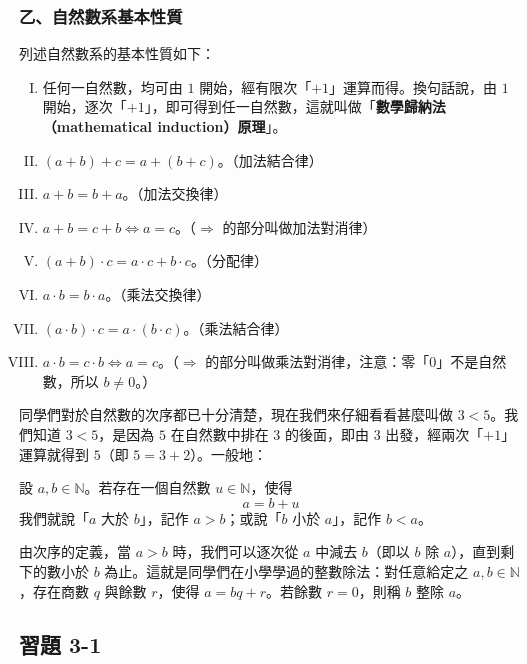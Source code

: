 \subsubsection*{乙、自然數系基本性質}\label{subsec:nat_axioms}

列述自然數系的基本性質如下：
\begin{enumerate}[I.]
  \item 任何一自然數，均可由 $1$ 開始，經有限次「$+1$」運算而得。換句話說，由 $1$ 開始，逐次「$+1$」，即可得到任一自然數，這就叫做「\textbf{數學歸納法（mathematical induction）原理}」。
  \item $(a+b)+c = a+(b+c)$。（加法結合律）
  \item $a+b = b+a$。（加法交換律）
  \item $a+b = c+b \iff a = c$。（$\Rightarrow$ 的部分叫做加法對消律）
  \item $(a+b) \cdot c = a \cdot c + b \cdot c$。（分配律）
  \item $a \cdot b = b \cdot a$。（乘法交換律）
  \item $(a \cdot b) \cdot c = a \cdot (b \cdot c)$。（乘法結合律）
  \item $a \cdot b = c \cdot b \iff a = c$。（$\Rightarrow$ 的部分叫做乘法對消律，注意：零「$0$」不是自然數，所以 $b \neq 0$。）
\end{enumerate}

同學們對於自然數的次序都已十分清楚，現在我們來仔細看看甚麼叫做 $3 < 5$。我們知道 $3 < 5$，是因為 $5$ 在自然數中排在 $3$ 的後面，即由 $3$ 出發，經兩次「$+1$」運算就得到 $5$（即 $5 = 3 + 2$）。一般地：

\begin{definition}[自然數的大小次序]\label{def:nat_order}
設 $a, b \in \mathbb{N}$。若存在一個自然數 $u \in \mathbb{N}$，使得
\begin{equation}\label{eq:nat_greater}
  a = b + u
\end{equation}
我們就說「$a$ 大於 $b$」，記作 $a > b$；或說「$b$ 小於 $a$」，記作 $b < a$。
\end{definition}

由次序的定義，當 $a > b$ 時，我們可以逐次從 $a$ 中減去 $b$（即以 $b$ 除 $a$），直到剩下的數小於 $b$ 為止。這就是同學們在小學學過的整數除法：對任意給定之 $a, b \in \mathbb{N}$，存在商數 $q$ 與餘數 $r$，使得 $a = bq + r$。若餘數 $r = 0$，則稱 $b$ 整除 $a$。

\subsection*{習題 3-1}\label{sec:ex3-1}

